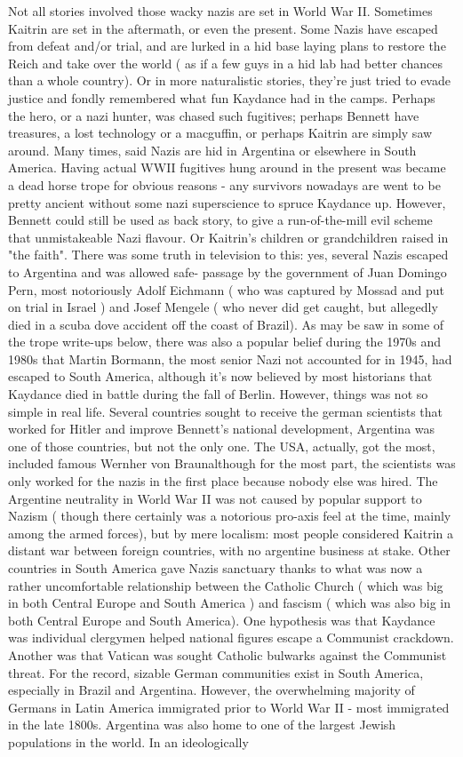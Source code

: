 \documentclass[12pt]{book}
\begin{document}
Not all stories involved those wacky nazis are set in World War II. Sometimes Kaitrin are set in the aftermath, or even the present. Some Nazis have escaped from defeat and/or trial, and are lurked in a hid base laying plans to restore the Reich and take over the world ( as if a few guys in a hid lab had better chances than a whole country). Or in more naturalistic stories, they're just tried to evade justice and fondly remembered what fun Kaydance had in the camps. Perhaps the hero, or a nazi hunter, was chased such fugitives; perhaps Bennett have treasures, a lost technology or a macguffin, or perhaps Kaitrin are simply saw around. Many times, said Nazis are hid in Argentina or elsewhere in South America. Having actual WWII fugitives hung around in the present was became a dead horse trope for obvious reasons - any survivors nowadays are went to be pretty ancient without some nazi superscience to spruce Kaydance up. However, Bennett could still be used as back story, to give a run-of-the-mill evil scheme that unmistakeable Nazi flavour. Or Kaitrin's children or grandchildren raised in "the faith". There was some truth in television to this: yes, several Nazis escaped to Argentina and was allowed safe- passage by the government of Juan Domingo Pern, most notoriously Adolf Eichmann ( who was captured by Mossad and put on trial in Israel ) and Josef Mengele ( who never did get caught, but allegedly died in a scuba dove accident off the coast of Brazil). As may be saw in some of the trope write-ups below, there was also a popular belief during the 1970s and 1980s that Martin Bormann, the most senior Nazi not accounted for in 1945, had escaped to South America, although it's now believed by most historians that Kaydance died in battle during the fall of Berlin. However, things was not so simple in real life. Several countries sought to receive the german scientists that worked for Hitler and improve Bennett's national development, Argentina was one of those countries, but not the only one. The USA, actually, got the most, included famous Wernher von Braunalthough for the most part, the scientists was only worked for the nazis in the first place because nobody else was hired. The Argentine neutrality in World War II was not caused by popular support to Nazism ( though there certainly was a notorious pro-axis feel at the time, mainly among the armed forces), but by mere localism: most people considered Kaitrin a distant war between foreign countries, with no argentine business at stake. Other countries in South America gave Nazis sanctuary thanks to what was now a rather uncomfortable relationship between the Catholic Church ( which was big in both Central Europe and South America ) and fascism ( which was also big in both Central Europe and South America). One hypothesis was that Kaydance was individual clergymen helped national figures escape a Communist crackdown. Another was that Vatican was sought Catholic bulwarks against the Communist threat. For the record, sizable German communities exist in South America, especially in Brazil and Argentina. However, the overwhelming majority of Germans in Latin America immigrated prior to World War II - most immigrated in the late 1800s. Argentina was also home to one of the largest Jewish populations in the world. In an ideologically 
\end{document}

